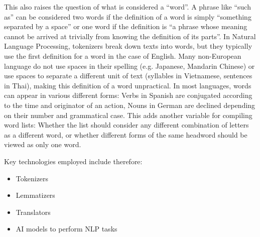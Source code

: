 \begin{description}
	      This also raises the question of what is considered a “word”.
	      A phrase like “such as” can be considered two words if the definition of a word is simply “something separated by a space” or one word if the definition is “a phrase whose meaning cannot be arrived at trivially from knowing the definition of its parts”.
	      In Natural Language Processing, tokenizers break down texts into words, but they typically use the first definition for a word in the case of English.
	      Many non-European language do not use spaces in their spelling (e.g. Japanese, Mandarin Chinese) or use spaces to separate a different unit of text (syllables in Vietnamese, sentences in Thai), making this definition of a word unpractical.
	      In most languages, words can appear in various different forms: Verbs in Spanish are conjugated according to the time and originator of an action, Nouns in German are declined depending on their number and grammatical case.
	      This adds another variable for compiling word lists: Whether the list should consider any different combination of letters as a different word, or whether different forms of the same headword should be viewed as only one word.
\end{description}

Key technologies employed include therefore:
\begin{itemize}
	\item Tokenizers
	\item Lemmatizers
	\item Translators
	\item AI models to perform NLP tasks
\end{itemize}

